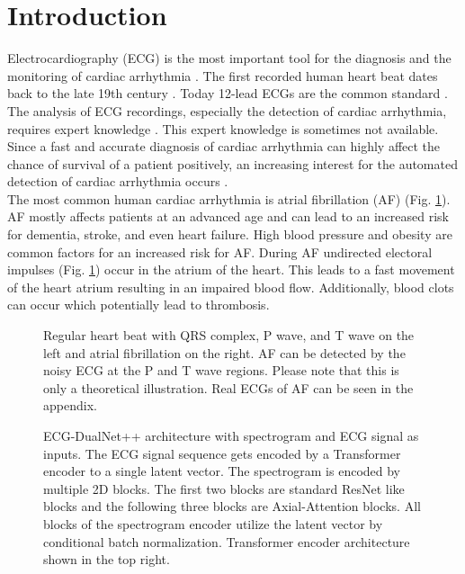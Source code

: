 \section{Introduction} \label{sec:introduction}

Electrocardiography (ECG) is the most important tool for the diagnosis and the monitoring of cardiac arrhythmia \cite{Becker2006, Anderson2009, Alghatrif2012}. The first recorded human heart beat dates back to the late 19th century \cite{Alghatrif2012}. Today 12-lead ECGs are the common standard \cite{Alghatrif2012}. The analysis of ECG recordings, especially the detection of cardiac arrhythmia, requires expert knowledge \cite{Becker2006}. This expert knowledge is sometimes not available. Since a fast and accurate diagnosis of cardiac arrhythmia can highly affect the chance of survival of a patient positively, an increasing interest for the automated detection of cardiac arrhythmia occurs \cite{Becker2006, Antink2017, Zihlmann2017, Clifford2017}. \\
\indent The most common human cardiac arrhythmia is atrial fibrillation (AF) (Fig. \ref{fig:beat}). \cite{Herold2019} AF mostly affects patients at an advanced age and can lead to an increased risk for dementia, stroke, and even heart failure. High blood pressure and obesity are common factors for an increased risk for AF. During AF undirected electoral impulses (Fig. \ref{fig:beat}) occur in the atrium of the heart. This leads to a fast movement of the heart atrium resulting in an impaired blood flow. Additionally, blood clots can occur which potentially lead to thrombosis. \cite{Becker2006, Herold2019}\\
\begin{figure}[!ht] 
    \centering
    
    \caption{Regular heart beat with QRS complex, P wave, and T wave on the left and atrial fibrillation on the right. AF can be detected by the noisy ECG at the P and T wave regions. Please note that this is only a theoretical illustration. Real ECGs of AF can be seen in the appendix.}
    \label{fig:beat}
\end{figure}
\begin{figure*}[!ht]
    \centering
    
    \caption{ECG-DualNet++ architecture with spectrogram and ECG signal as inputs. The ECG signal sequence gets encoded by a Transformer encoder to a single latent vector. The spectrogram is encoded by multiple 2D blocks. The first two blocks are standard ResNet like blocks and the following three blocks are Axial-Attention blocks. All blocks of the spectrogram encoder utilize the latent vector by conditional batch normalization. Transformer encoder \cite{Vaswani2017} architecture shown in the top right.}
    \label{fig:ecg_dual_net}
\end{figure*}
